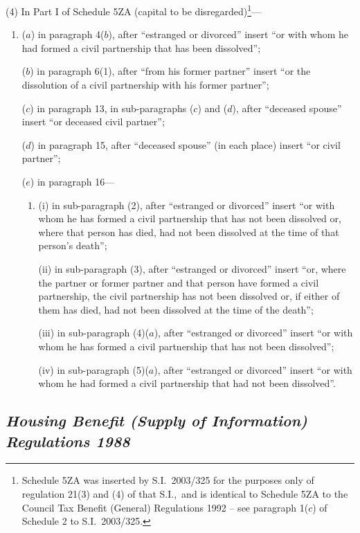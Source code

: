 \documentclass[12pt,a4paper]{article}
\begin{document}
(4) In Part I of Schedule 5ZA (capital to be disregarded)\footnote{Schedule 5ZA was inserted by S.I.\ 2003/325 for the purposes only of regulation 21(3) and (4) of that S.I.,\ and is identical to Schedule 5ZA to the Council Tax Benefit (General) Regulations 1992 – see paragraph 1($c$) of Schedule 2 to S.I.\ 2003/325.}—
\begin{enumerate}\item[]
($a$) in paragraph 4($b$), after “estranged or divorced” insert “or with whom he had formed a civil partnership that has been dissolved”;

($b$) in paragraph 6(1), after “from his former partner” insert “or the dissolution of a civil partnership with his former partner”;

($c$) in paragraph 13, in sub-paragraphs ($c$)  and ($d$), after “deceased spouse” insert “or deceased civil partner”;

($d$) in paragraph 15, after “deceased spouse” (in each place) insert “or civil partner”;

($e$) in paragraph 16—
\begin{enumerate}\item[]
(i) in sub-paragraph (2), after “estranged or divorced” insert “or with whom he has formed a civil partnership that has not been dissolved or, where that person has died, had not been dissolved at the time of that person’s death”;

(ii) in sub-paragraph (3), after “estranged or divorced” insert “or, where the partner or former partner and that person have formed a civil partnership, the civil partnership has not been dissolved or, if either of them has died, had not been dissolved at the time of the death”;

(iii) in sub-paragraph (4)($a$), after “estranged or divorced” insert “or with whom he has formed a civil partnership that has not been dissolved”;

(iv) in sub-paragraph (5)($a$), after “estranged or divorced” insert “or with whom he had formed a civil partnership that had not been dissolved”.
\end{enumerate}
\end{enumerate}

\subsection*{\itshape Housing Benefit (Supply of Information) Regulations 1988}
\end{document}
